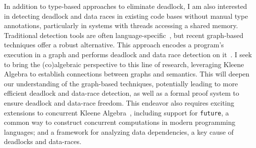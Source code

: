 \documentclass[11pt,a4paper,sans]{moderncv} %
\begin{document}

In addition to type-based approaches to eliminate deadlock, I am also interested in detecting deadlock and data races in existing code bases without manual type annotations, particularly in systems with threads accessing a shared memory.
Traditional detection tools are often language-specific~\cite{williams_StaticDeadlockDetection_2005,masticola_StaticDetectionDeadlocks_1993,engler_RacerXEffectiveStatic_2003,naik_EffectiveStaticDeadlock_2009}, but recent graph-based techniques offer a robust alternative. 
This approach encodes a program's execution in a graph and performs deadlock and data race detection on it~\cite{muller_StaticPredictionParallel_2022,muller_ResponsiveParallelismFutures_2020,rinaldi_PipelinesGraphTypes_2024,muller_LanguageAgnosticStaticDeadlock_2024a}.
I seek to bring the (co)algebraic perspective to this line of research, leveraging Kleene Algebra to establish connections between graphs and semantics. 
This will deepen our understanding of the graph-based techniques, potentially leading to more efficient deadlock and data-race detection, as well as a formal proof system to ensure deadlock and data-race freedom.
This endeavor also requires exciting extensions to concurrent Kleene Algebra~\cite{hoare_ConcurrentKleeneAlgebra_2011,kappe_ConcurrentKleeneAlgebra_2020,kappe_ConcurrentKleeneAlgebra_2018,wagemaker_PartiallyObservableConcurrent_2020,mciver_ProbabilisticConcurrentKleene_2013}, including support for \verb|future|, a common way to construct concurrent computations in modern programming languages; and a framework for analyzing data dependencies, a key cause of deadlocks and data-races.


\newpage
\printbibliography %
\end{document}
